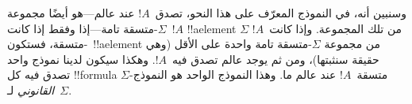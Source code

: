 \documentclass[../../../include/open-logic-section]{subfiles}
\begin{document}
وسنبين أنه، في النموذج المعرّف على هذا النحو، تصدق~$!A$ عند عالم---هو
أيضًا مجموعة $\Sigma$-متسقة تامة---إذا وفقط إذا كانت~$!A$ !!a{element}
من تلك المجموعة. وإذا كانت~$!A$ $\Sigma$-متسقة، فستكون~!!a{element}
من مجموعة $\Sigma$-متسقة تامة واحدة على الأقل (وهي حقيقة سنثبتها)،
ومن ثم يوجد عالم تصدق فيه~$!A$. وهكذا سيكون لدينا نموذج واحد تصدق فيه
كل !!{formula} $\Sigma$-متسقة~$!A$ عند عالم ما. وهذا النموذج الواحد هو
النموذج \emph{القانوني} لـ~$\Sigma$.
\end{document}
